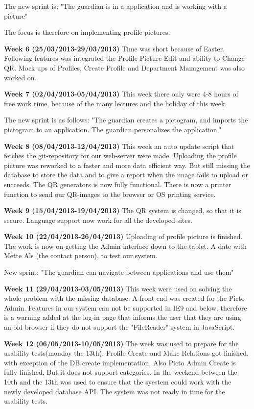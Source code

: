 The new sprint is:
"The guardian is in a application and is working with a picture"

The focus is therefore on implementing profile pictures. 

\textbf{Week 6 (25/03/2013-29/03/2013)}
Time was short because of Easter. 
Following features was integrated the Profile Picture Edit and ability to Change QR.
Mock ups of Profiles, Create Profile and Department Management was also worked on.    

\textbf{Week 7 (02/04/2013-05/04/2013)}
This week there only were 4-8 hours of free work time, because of the many lectures and the holiday of this week.

The new sprint is as follows: 
"The guardian creates a pictogram, and imports the pictogram to an application. The guardian personalizes the application."

\textbf{Week 8 (08/04/2013-12/04/2013)}
This week an auto update script that fetches the git-repository for our web-server were made.
Uploading the profile picture was reworked to a faster and more data efficient way. 
But still missing the database to store the data and to give a report when the image fails to upload or succeeds.
The QR generators is now fully functional. 
There is now a printer function to send our QR-images to the browser or OS printing service.

\textbf{Week 9 (15/04/2013-19/04/2013)}
The QR system is changed, so that it is secure. 
Language support now work for all the developed sites.

\textbf{Week 10 (22/04/2013-26/04/2013)}
Uploading of profile picture is finished.
The work is now on getting the Admin interface down to the tablet.
A date with Mette Als (the contact person), to test our system.

New sprint: 
"The guardian can navigate between applications and use them"

\textbf{Week 11 (29/04/2013-03/05/2013)}
This week were used on solving the whole problem with the missing database.
A front end was created for the Picto Admin. Features  in our system can not be supported in IE9 and below. therefore is a warning added at the log-in page that informs the user that they are using an old browser if they do not support the "FileReader" system in JavaScript.

\textbf{Week 12 (06/05/2013-10/05/2013)}
The week was used to prepare for the usability tests(monday the 13th).
Profile Create and Make Relations got finished, with exception of the DB create implementation. 
Also Picto Admin Create is fully finished. But it does not support categories. 
In the weekend between the 10th and the 13th was used to ensure that the syestem could work with the newly developed database API. The system was not ready in time for the usability tests. 

